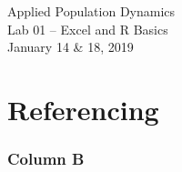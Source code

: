 \documentclass[color=usenames,dvipsnames]{beamer}\usepackage[]{graphicx}\usepackage[]{color}
\begin{document}
\begin{frame}[plain]
  \huge
  \begin{center}
    \huge Applied Population Dynamics \\
    \LARGE Lab 01 -- Excel and R Basics \\
    \large January 14 \& 18, 2019 \par
    \vspace{.5cm}
  \end{center}
\end{frame}


\section{Referencing}


\begin{frame}
  \frametitle{Column B}
\end{frame}
\end{document}
